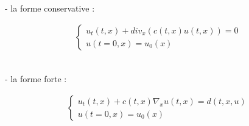 \documentclass[12pt]{article}
\begin{document}
\\- la forme conservative :

\begin{eqnarray}
\left\{ 
    \begin{array}{llll}
        u_t(t,x)+div_x(c(t,x)u(t,x))=0
        \\u(t=0,x)=u_0(x)
       	\end{array}
    \right .
\end{eqnarray}

\\- la forme forte : 

\begin{eqnarray}
\left\{ 
    \begin{array}{llll}
        u_t(t,x)+c(t,x)\nabla_xu(t,x)=d(t,x,u)
        \\u(t=0,x)=u_0(x)
       	\end{array}
    \right .
\end{eqnarray}
\end{document}
